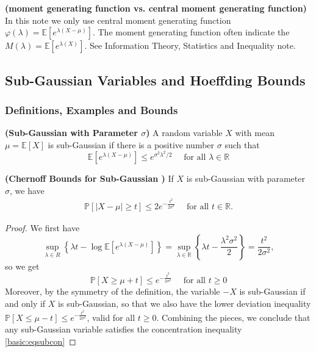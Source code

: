 \documentclass{article}
\newcommand{\bfs}[1]{\textbf{({#1})}}
\begin{document}
\begin{rema}{\bfs{moment generating function vs. central moment generating function}}
In this note we only use central moment generating function $\varphi(\lambda)=\mathbb{E}\left[e^{\lambda(X-\mu)}\right]$. The moment generating function often indicate the $M(\lambda) = \mathbb{E}\left[e^{\lambda(X)}\right]$. See Information Theory, Statistics and Inequality note.
\end{rema}

\subsection{Sub-Gaussian Variables and Hoeffding Bounds}\label{ssec:subgaussian}
\subsubsection{Definitions, Examples and  Bounds}\label{ssec:def_sing}
\begin{defa}{\bfs{Sub-Gaussian with Parameter $\sigma$}}\label{def_subg} A random variable $X$ with mean $\mu=\mathbb{E}[X]$ is sub-Gaussian if there is a positive number $\sigma$ such that
$$
\mathbb{E}\left[e^{\lambda(X-\mu)}\right] \leq e^{\sigma^{2} \lambda^{2} / 2} \quad \text { for all } \lambda \in \mathbb{R}
$$
\end{defa}
\begin{thma}{\bfs{Chernoff Bounds for Sub-Gaussian }}\label{thmchernoffgau}
If $X$ is sub-Gaussian with parameter $\sigma$, we have
\begin{align}
\mathbb{P}[|X-\mu| \geq t] \leq 2 e^{-\frac{t^{2}}{2 \sigma^{2}}} \quad \text { for all } t \in \mathbb{R}.\label{basic:eqsubcon}
\end{align}
\end{thma}
\begin{proof}
We first have 
$$
\sup _{\lambda \in R}\left\{\lambda t-\log \mathbb{E}\left[e^{\lambda(X-\mu)}\right]\right\}=\sup _{\lambda \in \mathbb{R}}\left\{\lambda t-\frac{\lambda^{2} \sigma^{2}}{2}\right\}=\frac{t^{2}}{2 \sigma^{2}},
$$ so we get 
$$
\mathbb{P}[X \geq \mu+t] \leq e^{-\frac{t^{2}}{2 \sigma^{2}}} \quad \text { for all } t \geq 0
$$
Moreover, by the symmetry of the definition, the variable $-X$ is sub-Gaussian if and only if $X$ is sub-Gaussian, so that we also have the lower deviation inequality $\mathbb{P}[X \leq \mu-t] \leq e^{-\frac{t^{2}}{2 \sigma^{2}}}$, valid for all $t \geq 0 .$ Combining the pieces, we conclude that any sub-Gaussian variable satisfies the concentration inequality \cref{basic:eqsubcon}
\end{proof}
\end{document}
